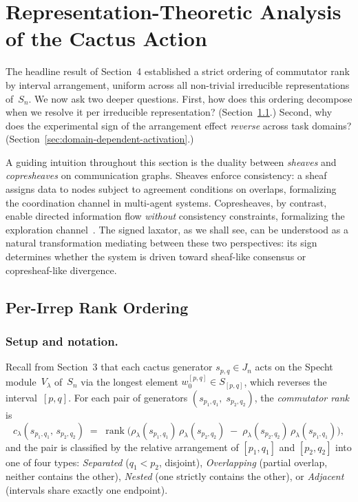 %

\section{Representation-Theoretic Analysis of the Cactus Action}
\label{sec:irrep-analysis}

The headline result of Section~4 established a strict ordering of
commutator rank by interval arrangement, uniform across all non-trivial
irreducible representations of~$S_n$.  We now ask two deeper questions.
First, how does this ordering decompose when we resolve it per
irreducible representation? (Section~\ref{sec:per-irrep-rank}.)
Second, why does the experimental sign of the arrangement effect
\emph{reverse} across task domains?
(Section~\ref{sec:domain-dependent-activation}.)

A guiding intuition throughout this section is the duality between
\emph{sheaves} and \emph{copresheaves} on communication graphs.
Sheaves enforce consistency: a sheaf assigns data to nodes subject to
agreement conditions on overlaps, formalizing the coordination channel
in multi-agent systems.  Copresheaves, by contrast, enable directed
information flow \emph{without} consistency constraints, formalizing
the exploration channel~\cite{hajij2025copresheaf}.
The signed laxator, as we shall see, can be understood as a natural
transformation mediating between these two perspectives: its sign
determines whether the system is driven toward sheaf-like consensus or
copresheaf-like divergence.

\subsection{Per-Irrep Rank Ordering}
\label{sec:per-irrep-rank}

\subsubsection{Setup and notation.}

Recall from Section~3 that each cactus generator
$s_{p,q} \in J_n$ acts on the Specht module~$V_\lambda$ of~$S_n$ via
the longest element $w_0^{[p,q]} \in S_{[p,q]}$, which reverses the
interval~$[p,q]$.  For each pair of generators
$(s_{p_1,q_1},\; s_{p_2,q_2})$, the \emph{commutator rank} is
\[
  c_\lambda(s_{p_1,q_1},\, s_{p_2,q_2})
  \;=\;
  \operatorname{rank}\!\bigl(
    \rho_\lambda(s_{p_1,q_1})\,\rho_\lambda(s_{p_2,q_2})
    \;-\;
    \rho_\lambda(s_{p_2,q_2})\,\rho_\lambda(s_{p_1,q_1})
  \bigr),
\]
and the pair is classified by the relative arrangement of
$[p_1,q_1]$ and $[p_2,q_2]$ into one of four types:
\emph{Separated} ($q_1 < p_2$, disjoint),
\emph{Overlapping} (partial overlap, neither contains the other),
\emph{Nested} (one strictly contains the other), or
\emph{Adjacent} (intervals share exactly one endpoint).

